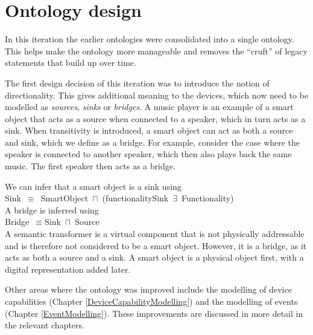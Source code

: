 \section{Ontology design}
\label{OntologyDesign3}

In this iteration the earlier ontologies were consolidated into a single ontology. This helps make the ontology more manageable and removes the ``cruft'' of legacy statements that build up over time. 

The first design decision of this iteration was to introduce the notion of directionality. This gives additional meaning to the devices, which now need to be modelled as \emph{sources}, \emph{sinks} or \emph{bridges}. A music player is an example of a smart object that acts as a source when connected to a speaker, which in turn acts as a sink. When transitivity is introduced, a smart object can act as both a source and sink, which we define as a bridge. For example, consider the case where the speaker is connected to another speaker, which then also plays back the same music. The first speaker then acts as a bridge.

We can infer that a smart object is a sink using\\

\noindent Sink~\ensuremath{\equiv}~SmartObject~\ensuremath{\sqcap}~(functionalitySink~\ensuremath{\exists}~Functionality)\\ 

A bridge is inferred using\\

\noindent Bridge~\ensuremath{\equiv}Sink~\ensuremath{\sqcap}~Source\\ 

A semantic transformer is a virtual component that is not physically addressable and is therefore not considered to be a smart object. However, it is a bridge, as it acts as both a source and a sink. A smart object is a physical object first, with a digital representation added later.

Other areas where the ontology was improved include the modelling of device capabilities (Chapter \ref{DeviceCapabilityModelling}) and the modelling of events (Chapter \ref{EventModelling}). These improvements are discussed in more detail in the relevant chapters. 




